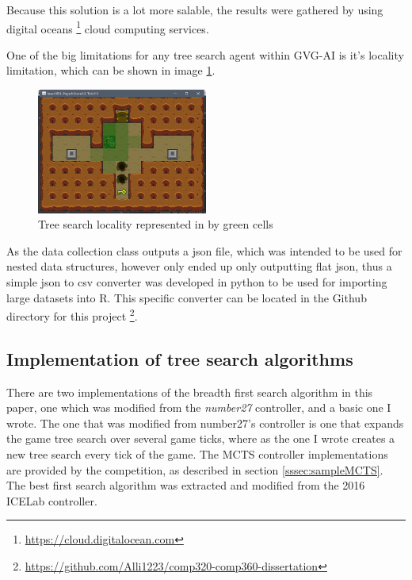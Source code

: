 \documentclass[journal]{IEEEtran}
\begin{document}
	Because this solution is a lot more salable, the results were gathered by using digital oceans \footnote{\url{https://cloud.digitalocean.com}} cloud computing services.
	
	One of the big limitations for any tree search agent within GVG-AI is it's locality limitation, which can be shown in image \ref{fig:locality}.

	\begin{figure}[h]
		   \centering
		   \includegraphics[width=0.5\textwidth]{BrFS-Locality}
		   \caption{ Tree search locality represented in by green cells }
		   \label{fig:locality}
	\end{figure}

	As the data collection class outputs a json file, which was intended to be used for nested data structures, however only ended up only outputting flat json, thus a simple json to csv converter was developed in python to be used for importing large datasets into R. This specific converter can be located in the Github directory for this project \footnote{\url{https://github.com/Alli1223/comp320-comp360-dissertation}}.

	
	\subsection{Implementation of tree search algorithms}
	There are two implementations of the breadth first search algorithm in this paper, one which was modified from the \textit{number27} controller, and  a basic one I wrote. The one that was modified from number27's controller is one that expands the game tree search over several game ticks, where as the one I wrote creates a new tree search every tick of the game.
	The MCTS controller implementations are provided by the competition, as described in section \ref{sssec:sampleMCTS}.
	The best first search algorithm was extracted and modified from the 2016 ICELab controller.
\end{document}
